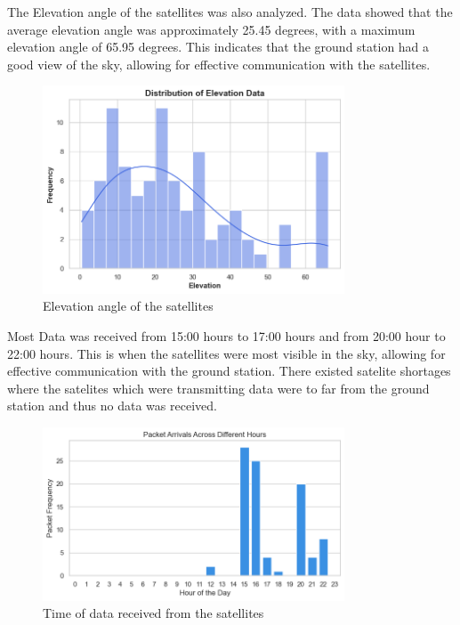 \documentclass[12pt,a4paper]{article}
\begin{document}
The Elevation angle of the satellites was also analyzed. The data showed that the average elevation angle was approximately 25.45 degrees, with a maximum elevation angle of 65.95 degrees. This indicates that the ground station had a good view of the sky, allowing for effective communication with the satellites.
\begin{figure}[H]
    \centering
    \includegraphics[width=0.8\textwidth]{../images/elevation.png}
    \caption{Elevation angle of the satellites}
    \label{fig:elevation_data}
\end{figure}

Most Data was received from 15:00 hours to 17:00 hours and from 20:00 hour to 22:00 hours. This is when the satellites were most visible in the sky, allowing for effective communication with the ground station. There existed satelite shortages where the satelites which were transmitting data were to far from the ground station and thus no data was received.

\begin{figure}[H]
    \centering
    \includegraphics[width=0.8\textwidth]{../images/daytime.png}
    \caption{Time of data received from the satellites}
    \label{fig:time_data}
\end{figure}
\end{document}
